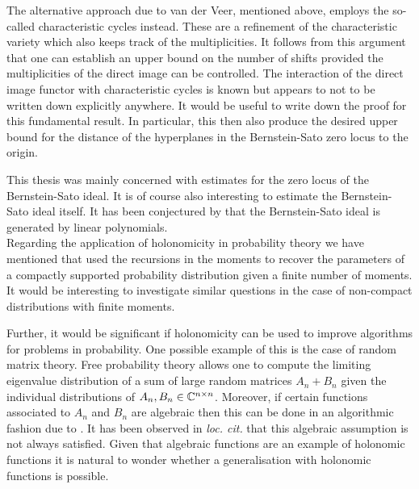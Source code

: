 The alternative approach due to van der Veer, mentioned above, employs the so-called characteristic cycles instead. 
These are a refinement of the characteristic variety which also keeps track of the multiplicities. 
It follows from this argument that one can establish an upper bound on the number of shifts provided the multiplicities of the direct image can be controlled. 
The interaction of the direct image functor with characteristic cycles is known but appears to not to be written down explicitly anywhere.
It would be useful to write down the proof for this fundamental result. 
In particular, this then also produce the desired upper bound for the distance of the hyperplanes in the Bernstein-Sato zero locus to the origin. 

This thesis was mainly concerned with estimates for the zero locus of the Bernstein-Sato ideal. 
It is of course also interesting to estimate the Bernstein-Sato ideal itself. 
It has been conjectured by \cite{budur2015bernsteinB} that the Bernstein-Sato ideal is generated by linear polynomials. \\


\noindent
Regarding the application of holonomicity in probability theory we have mentioned that \cite{bitoun2019feynman} used the recursions in the moments to recover the parameters of a compactly supported probability distribution given a finite number of moments. 
It would be interesting to investigate similar questions in the case of non-compact distributions with finite moments.

Further, it would be significant if holonomicity can be used to improve algorithms for problems in probability. 
One possible example of this is the case of random matrix theory. 
Free probability theory allows one to compute the limiting eigenvalue distribution of a sum of large random matrices $A_n+B_n$ given the individual distributions of $A_n,B_n\in \mathbb{C}^{n\times n}$.  
Moreover, if certain functions associated to $A_n$ and $B_n$ are algebraic then this can be done in an algorithmic fashion due to \cite{rao2008polynomial}. 
It has been observed in {\it loc. cit.} that this algebraic assumption is not always satisfied. 
Given that algebraic functions are an example of holonomic functions it is natural to wonder whether a generalisation with holonomic functions is possible. 







